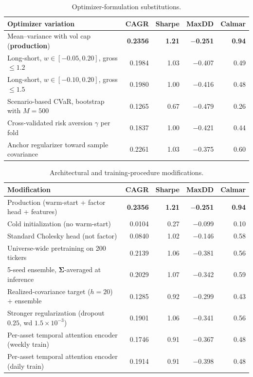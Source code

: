 \documentclass[11pt]{article}
\newcommand{\Sig}{\boldsymbol{\Sigma}}
\begin{document}
\begin{table}[h]
\centering
\caption{Optimizer-formulation substitutions.}
\label{tab:ablation_opt}
\small
\begin{tabular}{lrrrr}
\toprule
Optimizer variation & CAGR & Sharpe & MaxDD & Calmar \\
\midrule
Mean--variance with vol cap (\textbf{production})      & \textbf{0.2356} & \textbf{1.21} & \textbf{$-$0.251} & \textbf{0.94} \\
Long-short, $w \in [-0.05, 0.20]$, gross $\leq 1.2$    & 0.1984 & 1.03 & $-$0.407 & 0.49 \\
Long-short, $w \in [-0.10, 0.20]$, gross $\leq 1.5$    & 0.1980 & 1.00 & $-$0.416 & 0.48 \\
Scenario-based CVaR, bootstrap with $M = 500$           & 0.1265 & 0.67 & $-$0.479 & 0.26 \\
Cross-validated risk aversion $\gamma$ per fold         & 0.1837 & 1.00 & $-$0.421 & 0.44 \\
Anchor regularizer toward sample covariance             & 0.2261 & 1.03 & $-$0.375 & 0.60 \\
\bottomrule
\end{tabular}
\end{table}

\begin{table}[h]
\centering
\caption{Architectural and training-procedure modifications.}
\label{tab:ablation_arch}
\small
\begin{tabular}{lrrrr}
\toprule
Modification & CAGR & Sharpe & MaxDD & Calmar \\
\midrule
Production (warm-start + factor head + features)    & \textbf{0.2356} & \textbf{1.21} & \textbf{$-$0.251} & \textbf{0.94} \\
Cold initialization (no warm-start)                 & 0.0104 & 0.27 & $-$0.099 & 0.10 \\
Standard Cholesky head (not factor)                 & 0.0840 & 1.02 & $-$0.146 & 0.58 \\
Universe-wide pretraining on 200 tickers            & 0.2139 & 1.06 & $-$0.381 & 0.56 \\
5-seed ensemble, $\Sig$-averaged at inference        & 0.2029 & 1.07 & $-$0.342 & 0.59 \\
Realized-covariance target ($h{=}20$) + ensemble    & 0.1285 & 0.92 & $-$0.299 & 0.43 \\
Stronger regularization (dropout $0.25$, wd $1.5\!\times\!10^{-3}$) & 0.1901 & 1.06 & $-$0.341 & 0.56 \\
Per-asset temporal attention encoder (weekly train) & 0.1746 & 0.91 & $-$0.367 & 0.48 \\
Per-asset temporal attention encoder (daily train)  & 0.1914 & 0.91 & $-$0.398 & 0.48 \\
\bottomrule
\end{tabular}
\end{table}
\end{document}

